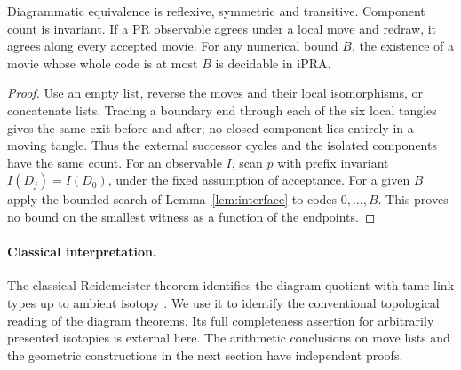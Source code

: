 \begin{proposition}
Diagrammatic equivalence is reflexive, symmetric and transitive. Component count is invariant. If a PR observable agrees under a local move and redraw, it agrees along every accepted movie. For any numerical bound $B$, the existence of a movie whose whole code is at most $B$ is decidable in iPRA.
\end{proposition}
\begin{proof}
Use an empty list, reverse the moves and their local isomorphisms, or concatenate lists. Tracing a boundary end through each of the six local tangles gives the same exit before and after; no closed component lies entirely in a moving tangle. Thus the external successor cycles and the isolated components have the same count. For an observable $I$, scan $p$ with prefix invariant $I(D_j)=I(D_0)$, under the fixed assumption of acceptance. For a given $B$ apply the bounded search of Lemma~\ref{lem:interface} to codes $0,\ldots,B$. This proves no bound on the smallest witness as a function of the endpoints.
\end{proof}

\paragraph{Classical interpretation.}
The classical Reidemeister theorem identifies the diagram quotient with tame link types up to ambient isotopy \cite{rei,kauffman}. We use it to identify the conventional topological reading of the diagram theorems. Its full completeness assertion for arbitrarily presented isotopies is external here. The arithmetic conclusions on move lists and the geometric constructions in the next section have independent proofs.

